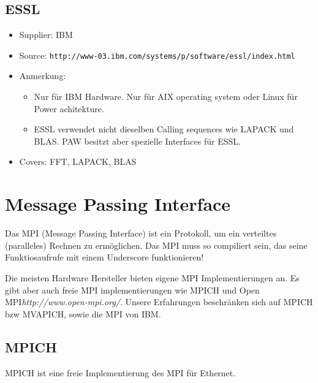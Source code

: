 \documentclass[a4paper,10pt]{report}
\newcommand{\mytt}[1]{{\tt #1}}
\begin{document}
\subsection{ESSL}
\begin{itemize}
\item Supplier: IBM
\item Source: \mytt{http://www-03.ibm.com/systems/p/software/essl/index.html}
\item Anmerkung: 
\begin{itemize}
\item Nur f\"ur IBM Hardware. Nur f\"ur AIX operating
system oder Linux f\"ur Power achitekture.
\item ESSL verwendet nicht dieselben Calling sequences wie LAPACK und
BLAS. PAW besitzt aber spezielle Interfaces f\"ur ESSL.
\end{itemize}
\item Covers: FFT, LAPACK, BLAS
\end{itemize}

\newpage
\section{Message Passing Interface}
Das MPI (Message Passing Interface) ist ein Protokoll, um ein
verteiltes (paralleles) Rechnen zu ermöglichen.  Das MPI muss so
compiliert sein, das seine Funktiosaufrufe mit einem Underscore
funktionieren!

Die meisten Hardware Hersteller bieten eigene MPI Implementierungen
an. Es gibt aber auch freie MPI implementierungen wie MPICH und Open
MPI\textit{http://www.open-mpi.org/}. Unsere Erfahrungen beschr\"anken
sich auf MPICH bzw MVAPICH, sowie die MPI von IBM.

\subsection{MPICH}
\label{sec:mpich}
MPICH ist eine freie Implementierung des MPI für Ethernet.
\end{document}
